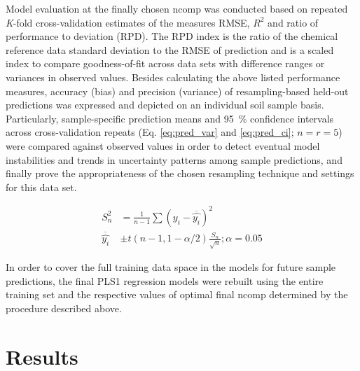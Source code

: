 \documentclass[10pt,letterpaper]{article}
\begin{document}
Model evaluation at the finally chosen ncomp was conducted based on repeated
\emph{K}-fold cross-validation estimates of the measures RMSE, $R^2$ and ratio
of performance to deviation (RPD). The RPD index is the ratio of the chemical
reference data standard deviation to the RMSE of prediction and is a scaled
index to compare goodness-of-fit across data sets with difference ranges or
variances in observed values. Besides calculating the above listed performance
measures, accuracy (bias) and precision (variance) of resampling-based held-out
predictions was expressed and depicted on an individual soil sample basis.
Particularly, sample-specific prediction means and \SI{95}{\%} confidence
intervals across cross-validation repeats (Eq. \ref{eq:pred_var} and
\ref{eq:pred_ci}; $n = r = 5$) were compared against observed values in order to
detect eventual model instabilities and trends in uncertainty patterns among
sample predictions, and finally prove the appropriateness of the chosen
resampling technique and settings for this data set.

\begin{align}
\label{eq:pred_var}
S_n^2 &= \frac{1}{n - 1} \sum{{(y_i - \overline{\hat{y_i}})}^2} \\
\label{eq:pred_ci}
\overline{\hat{y_i}} &\pm t(n - 1, 1 - \alpha / 2) \frac{S_n}{\sqrt{n}};
\alpha = 0.05
\end{align}

In order to cover the full training data space in the models for future sample
predictions, the final PLS1 regression models were rebuilt using the entire
training set and the respective values of optimal final ncomp determined by the
procedure described above.




\section*{Results}
\end{document}
